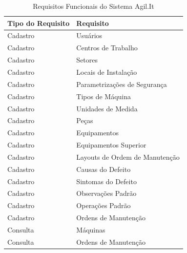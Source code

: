 \begin{table}[H]
	\centering
	\caption{\label{tabela-requsitos-funcionais}Requisitos Funcionais do Sistema Agil.It}
	\begin{tabular}{l|l}
		\hline
		\textbf{Tipo do Requisito} & \textbf{Requisito}                              \\ \hline
		Cadastro                   & Usuários                                       \\ \hline
		Cadastro                   & Centros de Trabalho                            \\ \hline
		Cadastro                   & Setores                                        \\ \hline
		Cadastro                   & Locais de Instalação                           \\ \hline
		Cadastro                   & Parametrizações de Segurança                   \\ \hline
		Cadastro                   & Tipos de Máquina                               \\ \hline
		Cadastro                   & Unidades de Medida                             \\ \hline
		Cadastro                   & Peças                                          \\ \hline
		Cadastro                   & Equipamentos                                   \\ \hline
		Cadastro                   & Equipamentos Superior                          \\ \hline
		Cadastro                   & Layouts de Ordem de Manutenção                 \\ \hline
		Cadastro                   & Causas do Defeito                              \\ \hline
		Cadastro                   & Sintomas do Defeito                            \\ \hline
		Cadastro                   & Observações Padrão                             \\ \hline
		Cadastro                   & Operações Padrão                               \\ \hline
		Cadastro                   & Ordens de Manutenção                           \\ \hline
		Consulta                   & Máquinas                                       \\ \hline
		Consulta                   & Ordens de Manutenção                           \\ \hline

\end{tabular}
\end{table}
